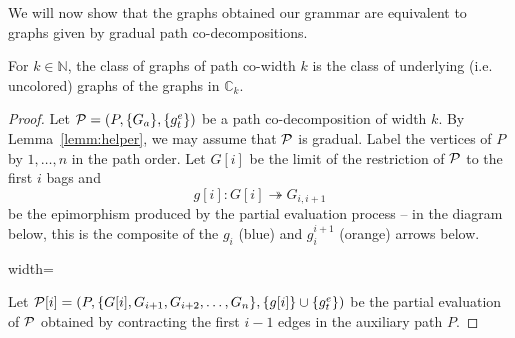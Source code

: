 We will now show that the graphs obtained our grammar are equivalent to graphs given by gradual path co-decompositions. 

\begin{lemma}
    For $k\in\mathbb{N}$, the class of graphs of path co-width $k$ is the class of underlying (i.e. uncolored) graphs of the graphs in $\mathbb{C}_k$.
\end{lemma}
\begin{proof}
    Let $\operatorname{\mathcal{P}}=(P,\{G_a\},\{g_t^e\})$ be a path co-decomposition of width $k$. By Lemma~\ref{lemm:helper}, we may assume that $\operatorname{\mathcal{P}}$ is gradual. Label the vertices of $P$ by $1,\ldots,n$ in the path order. Let $G[i]$ be the limit of the restriction of $\operatorname{\mathcal{P}}$ to the first $i$ bags and \[g[i] \colon G[i] \twoheadrightarrow G_{i,i+1}\] be the epimorphism produced by the partial evaluation process -- in the diagram below, this is the composite of the $g_i$ (blue) and $g_i^{i+1}$ (orange) arrows below. 
   \begin{center}
\begin{adjustbox}{width=\textwidth}
\end{adjustbox}
\end{center}
    Let $\operatorname{\mathcal{P}}[i]=(P,\{G[i],G_{i+1},G_{i+2},\ldots,G_n\},\{g[i]\}\cup\{g_t^e\})$ be the partial evaluation of $\operatorname{\mathcal{P}}$ obtained by contracting the first $i-1$ edges in the auxiliary path $P$. 
    

\end{proof}
